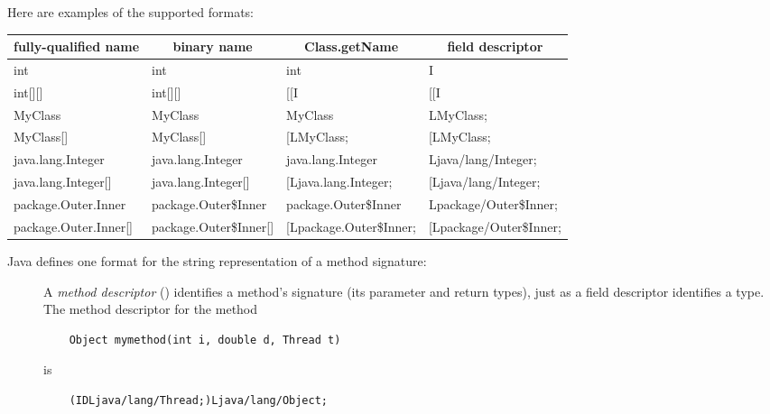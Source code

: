 Here are examples of the supported formats:

\begin{center}
\begin{tabular}{|l|l|l|l|}
\hline
\multicolumn{1}{|c|}{fully-qualified name} & \multicolumn{1}{c|}{binary name} & \multicolumn{1}{c|}{Class.getName} & \multicolumn{1}{c|}{field descriptor} \\ \hline
int &                   int &                    int &                     I \\
int[][] &               int[][] &                [[I &                     [[I \\
MyClass &               MyClass &                MyClass &                 LMyClass; \\
MyClass[] &             MyClass[] &              [LMyClass; &              [LMyClass; \\
java.lang.Integer &     java.lang.Integer &      java.lang.Integer &       Ljava/lang/Integer; \\
java.lang.Integer[] &   java.lang.Integer[] &    [Ljava.lang.Integer; &    [Ljava/lang/Integer; \\
package.Outer.Inner &   package.Outer\$Inner &   package.Outer\$Inner &   Lpackage/Outer\$Inner; \\
package.Outer.Inner[] & package.Outer\$Inner[] & [Lpackage.Outer\$Inner; & [Lpackage/Outer\$Inner; \\
\hline
\end{tabular}
\end{center}

Java defines one format for the string representation of a method signature:

\begin{description}

\item[]
  A \emph{method descriptor} () identifies a method's signature (its parameter and return
  types), just as a field descriptor identifies a 
  type.   The method descriptor for the method
\begin{Verbatim}
    Object mymethod(int i, double d, Thread t)
\end{Verbatim}
\noindent is
\begin{Verbatim}
    (IDLjava/lang/Thread;)Ljava/lang/Object;
\end{Verbatim}

\end{description}


